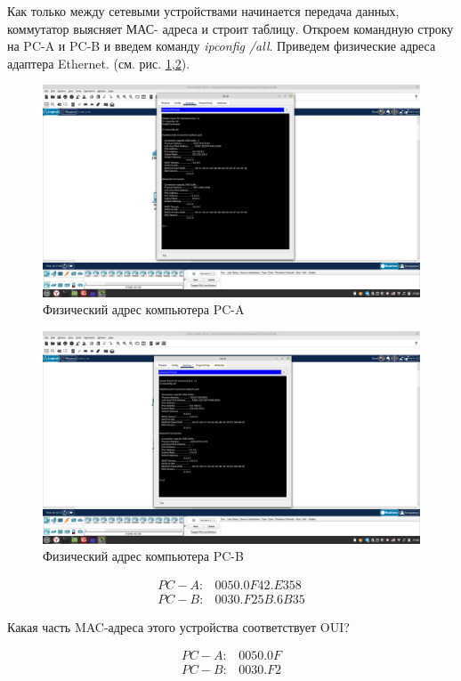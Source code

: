 \documentclass[a4paper,14pt]{extarticle}
\begin{document}
Как только между сетевыми устройствами начинается передача данных, коммутатор выясняет МАС-
адреса и строит таблицу.
Откроем командную строку на PC-A и PC-B и введем команду \textit{ipconfig /all}. Приведем физические
адреса адаптера Ethernet. (см. рис. \ref{fig:mac-pac-a},\ref{fig:mac-pac-b}).
\begin{figure}[h!]
	\centering
	\includegraphics[width=0.7\linewidth]{images/mac-pac-a}
	\caption{Физический адрес компьютера PC-A}
	\label{fig:mac-pac-a}
\end{figure}
\begin{figure}[h!]
	\centering
	\includegraphics[width=0.7\linewidth]{images/mac-pac-b}
	\caption{Физический адрес компьютера PC-B}
	\label{fig:mac-pac-b}
\end{figure}

\begin{align*}
PC-A:& 0050.0F42.E358\\
PC-B:& 0030.F25B.6B35
\end{align*}

Какая часть MAC-адреса этого устройства соответствует OUI?

\begin{align*}
PC-A:& 0050.0F\\
PC-B:& 0030.F2
\end{align*}
\end{document}
